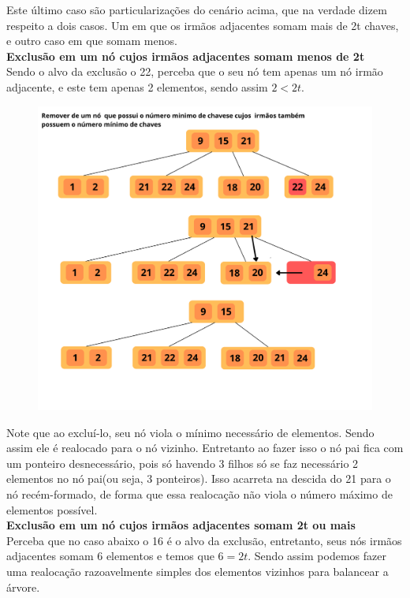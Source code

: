Este último caso são particularizações do cenário acima, que na verdade dizem respeito a dois casos. Um em que os irmãos adjacentes somam mais de 2t chaves, e outro caso em que somam menos. \\

\textbf{Exclusão em um nó cujos irmãos adjacentes somam menos de 2t} \\

Sendo o alvo da exclusão o 22, perceba que o seu nó tem apenas um nó irmão adjacente, e este tem apenas 2 elementos, sendo assim $2 < 2t$.

\begin{figure}[H]
	\centering
	\includegraphics[scale=0.2]{figures/remocao3.png}
\end{figure}

Note que ao excluí-lo, seu nó viola o mínimo necessário de elementos. Sendo assim ele é realocado para o nó vizinho. Entretanto ao fazer isso o nó pai fica com um ponteiro desnecessário, pois só havendo 3 filhos só se faz necessário 2 elementos no nó pai(ou seja, 3 ponteiros). Isso acarreta na descida do 21 para o nó recém-formado, de forma que essa realocação não viola o número máximo de elementos possível.\\

\textbf{Exclusão em um nó cujos irmãos adjacentes somam 2t ou mais} \\

Perceba que no caso abaixo o 16 é o alvo da exclusão, entretanto, seus nós irmãos adjacentes somam 6 elementos e temos que $6 = 2t$. Sendo assim podemos fazer uma realocação razoavelmente simples dos elementos vizinhos para balancear a árvore.

